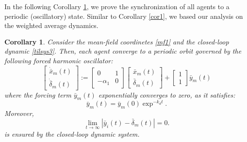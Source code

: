 \documentclass[journal,twoside]{IEEEtran}
\newtheorem{corollary}{Corollary}
\begin{document}
In the following Corollary \ref{cor2}, we prove the synchronization of all agents to a periodic (oscillatory) state. 
Similar to Corollary \ref{cor1}, we based our analysis on the weighted average dynamics. 

\begin{corollary} \label{cor2} \em 
Consider the mean-field coordinetes  \eqref{mf1} and the closed-loop dynamic \eqref{tilsys3}. 
Then, each agent converge to a periodic orbit governed by the following forced harmonic oscillator: 
\begin{equation}
\label{dynosc}
\left[ \begin{array}{c} \dot {\bar x}_{m} (t)   \\ \dot{\bar \delta}_{m} (t) \end{array} \right]:=\left[ \begin{array}{cc} 0  &  1 \\ -\alpha_1 & 0 \end{array} \right]   \left[ \begin{array}{c} {\bar x}_{m}(t) \\ {\bar \delta}_{m}(t)  \end{array} \right]  +\left[ \begin{array}{c} 1 \\1  \end{array} \right] {\bar y}_{m}(t)
\end{equation}
where the forcing term $\bar {y}_{m}(t)$ exponentially converges to zero, as it satisfies:
\begin{equation}
\label{x2m2}
\bar {y}_{m}(t)= \bar y_{m}(0)\exp^{-k_dt}.
\end{equation}
Moreover, 
\begin{equation}
\label{barx22}
\lim_{t \to \infty}  |\bar y_{i} (t) -  \bar \delta_m(t)|=0.
\end{equation}
is ensured by the closed-loop dynamic system.
\end{corollary}
\end{document}
